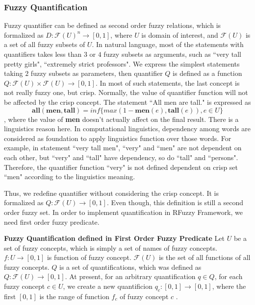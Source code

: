 \subsubsection{Fuzzy Quantification}
Fuzzy quantifier can be defined as second order fuzzy relations, which is formalized as $D: \mathcal{F}(U)^n \longrightarrow [0,1]$, where $U$ is domain of interest, and $\mathcal{F}(U)$ is a set of all fuzzy subsets of $U$. In natural language, most of the statements with quantifiers takes less than $3$ or $4$ fuzzy subsets as arguments,  such as ``very tall pretty girls", ``extremely strict professors". We express the simplest statements taking $2$ fuzzy subsets as parameters, then quantifier $Q$ is defined as a function $Q: \mathcal{F}(U) \times \mathcal{F}(U) \longrightarrow [0,1]$. In most of such statements, the last concept is not really fuzzy one, but crisp. Normally, the value of quantifier function will not be affected by the crisp concept. The statement ``All men are tall." is expressed as \[\textbf{all}(\textbf{men},\textbf{tall}) = inf\{max(1-\textbf{men}(e), \textbf{tall}(e)), e \in U \}\],  where the value of \textbf{men} doesn't actually affect on the final result. There is a linguistics reason here. In computational linguistics, dependency among words are considered as foundation to apply linguistics function over those words. For example, in statement ``very tall men", ``very" and ``men" are not dependent on each other, but ``very" and ``tall" have dependency, so do ``tall" and ``persons". Therefore, the quantifier function ``very" is not defined dependent on crisp set ``men" according to the linguistics meaning. 

Thus, we redefine quantifier without considering the crisp concept. It is formalized as $Q: \mathcal{F}(U) \longrightarrow [0,1]$. Even though, this definition is still a second order fuzzy set. In order to implement quantification in RFuzzy Framework, we need first order fuzzy predicate.

\begin{defin} \textbf{Fuzzy Quantification defined in First Order Fuzzy Predicate}
Let $U$ be a set of fuzzy concepts, which is simply a set of names of fuzzy concepts. $f : U \rightarrow [0,1]$ is function of fuzzy concept. $\mathcal{F}(U)$ is the set of all functions of all fuzzy concepts. $Q$ is a set of quantifications, which was defined as $Q: \mathcal{F}(U) \longrightarrow [0,1]$.
At present, for an arbitrary quantification $q \in Q$, for each fuzzy concept $c \in U$, we create a new quantificion $q_{c}: [0,1] \rightarrow [0,1]$, where the first $[0,1]$ is the range of function $f_{c}$ of fuzzy concept $c$ .
\end{defin}

